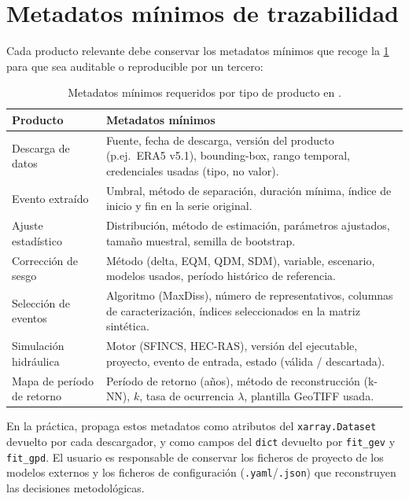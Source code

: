 \section{Metadatos mínimos de trazabilidad}

Cada producto relevante debe conservar los metadatos mínimos que recoge la \cref{tab:metadatos} para que sea auditable o reproducible por un tercero:

\begin{table}[htbp]
  \centering
  \caption{Metadatos mínimos requeridos por tipo de producto en \hydra.}
  \label{tab:metadatos}
  \begin{tabular}{p{}p{}}
    \toprule
    Producto & Metadatos mínimos \\
    \midrule
    Descarga de datos & Fuente, fecha de descarga, versión del producto (p.ej.\ ERA5 v5.1), bounding-box, rango temporal, credenciales usadas (tipo, no valor). \\[3pt]
    Evento extraído & Umbral, método de separación, duración mínima, índice de inicio y fin en la serie original. \\[3pt]
    Ajuste estadístico & Distribución, método de estimación, parámetros ajustados, tamaño muestral, semilla de bootstrap. \\[3pt]
    Corrección de sesgo & Método (delta, EQM, QDM, SDM), variable, escenario, modelos usados, período histórico de referencia. \\[3pt]
    Selección de eventos & Algoritmo (MaxDiss), número de representativos, columnas de caracterización, índices seleccionados en la matriz sintética. \\[3pt]
    Simulación hidráulica & Motor (SFINCS, HEC-RAS), versión del ejecutable, proyecto, evento de entrada, estado (válida / descartada). \\[3pt]
    Mapa de período de retorno & Período de retorno (años), método de reconstrucción (k-NN), $k$, tasa de ocurrencia $\lambda$, plantilla GeoTIFF usada. \\
    \bottomrule
  \end{tabular}
\end{table}

En la práctica, \pyhydra propaga estos metadatos como atributos del \texttt{xarray.Dataset} devuelto por cada descargador, y como campos del \texttt{dict} devuelto por \texttt{fit\_gev} y \texttt{fit\_gpd}. El usuario es responsable de conservar los ficheros de proyecto de los modelos externos y los ficheros de configuración (\texttt{.yaml}/\texttt{.json}) que reconstruyen las decisiones metodológicas.

